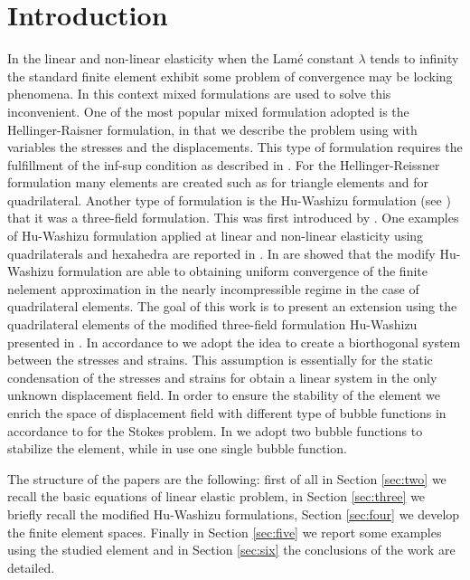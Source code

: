 \documentclass[preprint,12pt,authoryear]{elsarticle}
\begin{document}
\section{Introduction}\label{sec:one}
In the linear and non-linear elasticity when the Lamé constant $\lambda$ tends to infinity the standard finite element exhibit some problem of convergence may be locking phenomena.
In this context mixed formulations are used to solve this inconvenient.
One of the most popular mixed formulation adopted is the Hellinger-Raisner formulation, in that we describe the problem using with variables the stresses and the displacements.
This type of formulation requires the fulfillment of the inf-sup condition as described in \cite{boffi_book}.
For the Hellinger-Reissner formulation many elements are created such as \cite{arnold} for triangle elements and \cite{arnold_quad} for quadrilateral. 
Another type of formulation is the Hu-Washizu formulation (see \cite{hu,washizu}) that it was a three-field formulation.
This was first introduced by \cite{veubeke}.
One examples of Hu-Washizu formulation applied at linear and non-linear elasticity using quadrilaterals and hexahedra are reported in \cite{kasper_p1,kasper_p2}. 
In \cite{lamichhane_conv} are showed that the modify Hu-Washizu formulation are able to obtaining uniform convergence of the finite nelement approximation in the nearly incompressible regime in the case of quadrilateral elements.
The goal of this work is to present an extension using the quadrilateral elements of the modified three-field formulation Hu-Washizu presented in \cite{lamichhane_huwashizu}.
In accordance to \cite{lamichhane_three} we adopt the idea to create a biorthogonal system between the stresses and strains.
This assumption is essentially for the static condensation of the stresses and strains for obtain a linear system in the only unknown displacement field.
In order to ensure the stability of the element we enrich the space of displacement field with different type of bubble functions in accordance to \cite{bai,lamichhane} for the Stokes problem. 
In \cite{bai} we adopt two bubble functions to stabilize the element, while in \cite{lamichhane} use one single bubble function.  
 
The structure of the papers are the following: first of all in Section \ref{sec:two} we recall the basic equations of linear elastic problem, in Section \ref{sec:three} we briefly recall the modified Hu-Washizu formulations, Section \ref{sec:four} we develop the finite element spaces.
Finally in Section \ref{sec:five} we report some examples using the studied element and in Section \ref{sec:six} the conclusions of the work are detailed.
\end{document}
